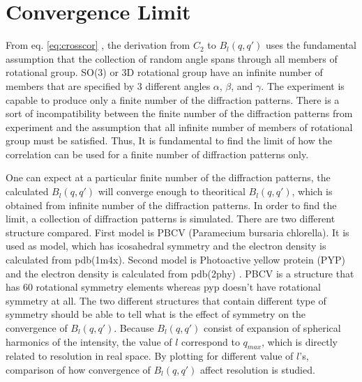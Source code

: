 \clearpage
\section{Convergence Limit} \label{sec:convlim}
From eq. \ref{eq:crosscor} , the derivation from $C_2$ to $B_{l}(q,q')$ uses the fundamental assumption that the collection of random angle spans through all members of rotational group.
SO(3) or 3D rotational group have an infinite number of members that are specified by 3 different angles $\alpha$, $\beta$, and $\gamma$.
The experiment is capable to produce only a finite number of the diffraction patterns.
 There is a sort of incompatibility between the finite number of the diffraction patterns from experiment and the assumption that all infinite number of members of rotational group must be satisfied.
Thus, It is fundamental to find the limit of how the correlation can be used for a finite number of diffraction patterns only.

One can expect at a particular finite number of the diffraction patterns, the calculated $B_{l}(q,q')$  will converge enough to theoritical $B_{l}(q,q')$, which is obtained from infinite number of the diffraction patterns.
 In order to find the limit, a collection of diffraction patterns is simulated. 
There are two different structure compared. First model is PBCV (Paramecium bursaria chlorella)\cite{RossmanPBCV}. It is used as model, which has icosahedral symmetry and the electron density is calculated from pdb(1m4x). Second model is Photoactive yellow protein (PYP) and the electron density is calculated from pdb(2phy) \cite{pyppaper}.
 PBCV is a structure that has 60 rotational symmetry elements whereas pyp doesn't have rotational symmetry at all.
 The two different structures that contain different type of symmetry should be able to tell what is the effect of symmetry on the convergence of $B_{l}(q,q')$. Because $B_{l}(q,q')$ consist of expansion of spherical harmonics of the intensity, the value of $l$ correspond to $q_{max}$, which is directly related to resolution in real space\cite{saldinvirus}.
 By plotting for different value of $l$'s, comparison of how convergence of $B_{l}(q,q')$ affect resolution is studied.

